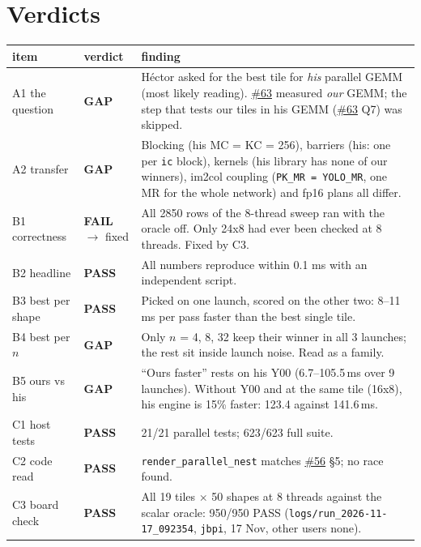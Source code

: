 \documentclass[10pt,a4paper]{article}
\newcommand{\iss}[1]{\href{https://github.com/JieGH/RVV_code_gen_via_MLIR_xDSL/issues/#1}{\##1}}
\newcommand{\bad}[1]{\textcolor{red!70!black}{\textbf{#1}}}
\newcommand{\good}[1]{\textcolor{green!45!black}{\textbf{#1}}}
\newcommand{\gap}[1]{\textcolor{orange!80!black}{\textbf{#1}}}
\begin{document}
\section*{Verdicts}
\begin{tabularx}{\linewidth}{@{}l l X@{}}
\toprule
item & verdict & finding \\
\midrule
A1 the question & \gap{GAP} & H\'ector asked for the best tile for \emph{his} parallel GEMM (most likely reading).
\iss{63} measured \emph{our} GEMM; the step that tests our tiles in his GEMM (\iss{63} Q7) was skipped. \\
A2 transfer & \gap{GAP} & Blocking (his MC = KC = 256), barriers (his: one per \texttt{ic} block), kernels (his
library has none of our winners), im2col coupling (\texttt{PK\_MR = YOLO\_MR}, one MR for the whole network) and fp16
plans all differ. \\
B1 correctness & \bad{FAIL} $\to$ fixed & All 2850 rows of the 8-thread sweep ran with the oracle off. Only 24x8
had ever been checked at 8 threads. Fixed by C3. \\
B2 headline & \good{PASS} & All numbers reproduce within 0.1 ms with an independent script. \\
B3 best per shape & \good{PASS} & Picked on one launch, scored on the other two: 8--11 ms per pass faster than the
best single tile. \\
B4 best per $n$ & \gap{GAP} & Only $n$ = 4, 8, 32 keep their winner in all 3 launches; the rest sit inside launch
noise. Read as a family. \\
B5 ours vs his & \gap{GAP} & ``Ours faster'' rests on his Y00 (6.7--105.5\,ms over 9 launches). Without Y00 and at the
same tile (16x8), his engine is 15\% faster: 123.4 against 141.6\,ms. \\
C1 host tests & \good{PASS} & 21/21 parallel tests; 623/623 full suite. \\
C2 code read & \good{PASS} & \texttt{render\_parallel\_nest} matches \iss{56} \S5; no race found. \\
C3 board check & \good{PASS} & All 19 tiles $\times$ 50 shapes at 8 threads against the scalar oracle: 950/950
PASS (\texttt{logs/run\_2026-11-17\_092354}, \texttt{jbpi}, 17 Nov, other users none). \\
\bottomrule
\end{tabularx}
\end{document}
